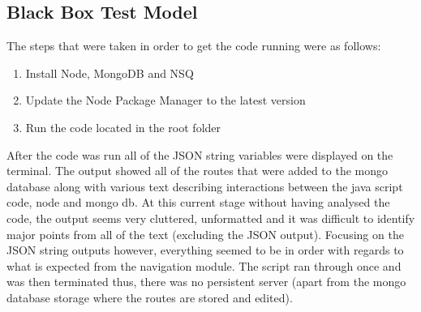 \subsection{Black Box Test Model}

The steps that were taken in order to get the code running were as follows:
\begin{enumerate}
\item Install Node, MongoDB and NSQ
\item Update the Node Package Manager to the latest version
\item Run the code located in the root folder
\end{enumerate}


After the code was run all of the JSON string variables were displayed on the terminal.
The output showed all of the routes that were added to the mongo database along with various text describing interactions between the java script code, node and mongo db.
At this current stage without having analysed the code, the output seems very cluttered,
unformatted and it was difficult to identify major points from all of the text (excluding the JSON output).
Focusing on the JSON string outputs however, everything seemed to be in order with regards to what is expected from the navigation module.
The script ran through once and was then terminated thus, there was no persistent server (apart from the mongo database storage where the routes are stored and edited).
